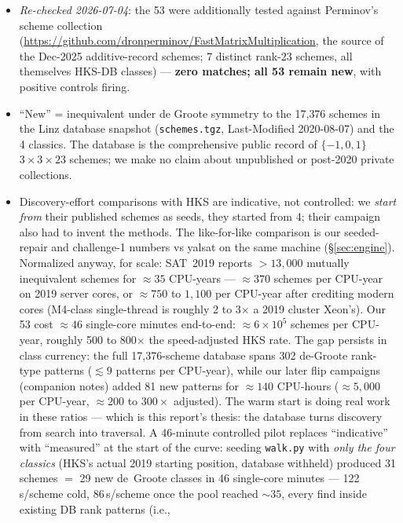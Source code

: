 \documentclass[10pt]{article}
\begin{document}
\begin{itemize}
\item \emph{Re-checked 2026-07-04}: the 53 were additionally tested
  against Perminov's scheme collection
  (\url{https://github.com/dronperminov/FastMatrixMultiplication},
  the source of the Dec-2025 additive-record schemes; 7 distinct
  rank-23 schemes, all themselves HKS-DB classes) --- \textbf{zero
  matches; all 53 remain new}, with positive controls firing.
\item ``New'' = inequivalent under de Groote symmetry to the 17{,}376
  schemes in the Linz database snapshot (\texttt{schemes.tgz},
  Last-Modified 2020-08-07) and the 4 classics. The database is the
  comprehensive public record of $\{-1,0,1\}$ $3{\times}3{\times}23$
  schemes; we make no claim about unpublished or post-2020 private
  collections.
\item Discovery-effort comparisons with HKS are indicative, not
  controlled: we \emph{start from} their published schemes as seeds,
  they started from 4; their campaign also had to invent the methods.
  The like-for-like comparison is our seeded-repair and challenge-1
  numbers vs yalsat on the same machine (\S\ref{sec:engine}).
  Normalized anyway, for scale: SAT~2019 reports ${>}13{,}000$
  mutually inequivalent schemes for ${\approx}35$ CPU-years ---
  ${\approx}370$ schemes per CPU-year on 2019 server cores, or
  ${\approx}750$ to $1{,}100$ per CPU-year after crediting modern
  cores (M4-class single-thread is roughly 2 to 3$\times$ a 2019
  cluster Xeon's). Our 53 cost ${\approx}46$ single-core minutes
  end-to-end: ${\approx}6{\times}10^{5}$ schemes per CPU-year,
  roughly 500 to 800$\times$ the speed-adjusted HKS rate. The gap
  persists in class currency: the full 17{,}376-scheme database
  spans 302 de-Groote rank-type patterns (${\lesssim}9$ patterns
  per CPU-year), while our later flip campaigns (companion notes)
  added 81 new patterns for ${\approx}140$ CPU-hours
  (${\approx}5{,}000$ per CPU-year, ${\approx}200$ to $300\times$
  adjusted). The warm start is doing real work in these ratios ---
  which is this report's thesis: the database turns discovery from
  search into traversal. A 46-minute controlled pilot replaces
  ``indicative'' with ``measured'' at the start of the curve:
  seeding \texttt{walk.py} with \emph{only the four classics}
  (HKS's actual 2019 starting position, database withheld) produced
  31 schemes $=$ 29 new de~Groote classes in 46 single-core minutes
  --- 122\,s/scheme cold, 86\,s/scheme once the pool reached
  ${\sim}35$, every find inside existing DB rank patterns (i.e.,

\end{itemize}
\end{document}
